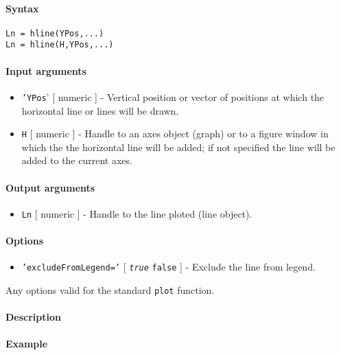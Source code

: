 


	\paragraph{Syntax}\label{syntax}

\begin{verbatim}
Ln = hline(YPos,...)
Ln = hline(H,YPos,...)
\end{verbatim}

\paragraph{Input arguments}\label{input-arguments}

\begin{itemize}
\item
  \texttt{'YPos}' {[} numeric {]} - Vertical position or vector of
  positions at which the horizontal line or lines will be drawn.
\item
  \texttt{H} {[} numeric {]} - Handle to an axes object (graph) or to a
  figure window in which the the horizontal line will be added; if not
  specified the line will be added to the current axes.
\end{itemize}

\paragraph{Output arguments}\label{output-arguments}

\begin{itemize}
\itemsep1pt\parskip0pt
\item
  \texttt{Ln} {[} numeric {]} - Handle to the line ploted (line object).
\end{itemize}

\paragraph{Options}\label{options}

\begin{itemize}
\itemsep1pt\parskip0pt
\item
  \texttt{'excludeFromLegend='} {[} \emph{\texttt{true}} \textbar{}
  \texttt{false} {]} - Exclude the line from legend.
\end{itemize}

Any options valid for the standard \texttt{plot} function.

\paragraph{Description}\label{description}

\paragraph{Example}\label{example}


